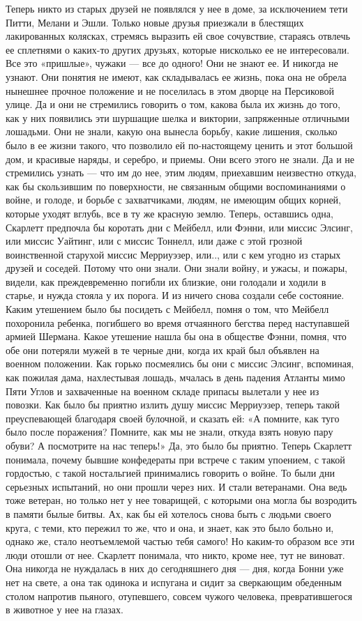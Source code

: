 Теперь никто из старых друзей не появлялся у нее в доме, за исключением тети Питти, Мелани и Эшли. Только новые друзья приезжали в блестящих лакированных колясках, стремясь выразить ей свое сочувствие, стараясь отвлечь ее сплетнями о каких-то других друзьях, которые нисколько ее не интересовали. Все это «пришлые», чужаки — все до одного! Они не знают ее. И никогда не узнают. Они понятия не имеют, как складывалась ее жизнь, пока она не обрела нынешнее прочное положение и не поселилась в этом дворце на Персиковой улице. Да и они не стремились говорить о том, какова была их жизнь до того, как у них появились эти шуршащие шелка и виктории, запряженные отличными лошадьми. Они не знали, какую она вынесла борьбу, какие лишения, сколько было в ее жизни такого, что позволило ей по-настоящему ценить и этот большой дом, и красивые наряды, и серебро, и приемы. Они всего этого не знали. Да и не стремились узнать — что им до нее, этим людям, приехавшим неизвестно откуда, как бы скользившим по поверхности, не связанным общими воспоминаниями о войне, и голоде, и борьбе с захватчиками, людям, не имеющим общих корней, которые уходят вглубь, все в ту же красную землю.
Теперь, оставшись одна, Скарлетт предпочла бы коротать дни с Мейбелл, или Фэнни, или миссис Элсинг, или миссис Уайтинг, или с миссис Тоннелл, или даже с этой грозной воинственной старухой миссис Мерриуэзер, или.., или с кем угодно из старых друзей и соседей. Потому что они знали. Они знали войну, и ужасы, и пожары, видели, как преждевременно погибли их близкие, они голодали и ходили в старье, и нужда стояла у их порога. И из ничего снова создали себе состояние.
Каким утешением было бы посидеть с Мейбелл, помня о том, что Мейбелл похоронила ребенка, погибшего во время отчаянного бегства перед наступавшей армией Шермана. Какое утешение нашла бы она в обществе Фэнни, помня, что обе они потеряли мужей в те черные дни, когда их край был объявлен на военном положении. Как горько посмеялись бы они с миссис Элсинг, вспоминая, как пожилая дама, нахлестывая лошадь, мчалась в день падения Атланты мимо Пяти Углов и захваченные на военном складе припасы вылетали у нее из повозки. Как было бы приятно излить душу миссис Мерриуэзер, теперь такой преуспевающей благодаря своей булочной, и сказать ей: «А помните, как туго было после поражения? Помните, как мы не знали, откуда взять новую пару обуви? А посмотрите на нас теперь!» Да, это было бы приятно. Теперь Скарлетт понимала, почему бывшие конфедераты при встрече с таким упоением, с такой гордостью, с такой ностальгией принимались говорить о войне. То были дни серьезных испытаний, но они прошли через них. И стали ветеранами. Она ведь тоже ветеран, но только нет у нее товарищей, с которыми она могла бы возродить в памяти былые битвы. Ах, как бы ей хотелось снова быть с людьми своего круга, с теми, кто пережил то же, что и она, и знает, как это было больно и, однако же, стало неотъемлемой частью тебя самого!
Но каким-то образом все эти люди отошли от нее. Скарлетт понимала, что никто, кроме нее, тут не виноват. Она никогда не нуждалась в них до сегодняшнего дня — дня, когда Бонни уже нет на свете, а она так одинока и испугана и сидит за сверкающим обеденным столом напротив пьяного, отупевшего, совсем чужого человека, превратившегося в животное у нее на глазах.

